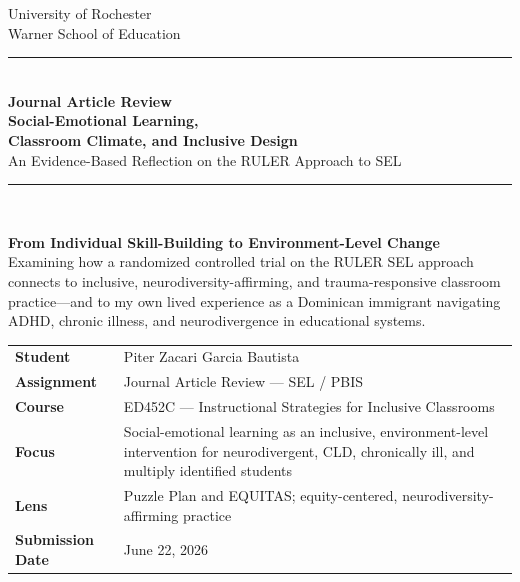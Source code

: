 \documentclass[11pt]{article}
\begin{document}
\begin{titlepage}
\thispagestyle{empty}

\begin{center}
{\large University of Rochester\\}
{\normalsize Warner School of Education\\[0.15in]}

{\color{PrimaryRed}\rule{\textwidth}{1.4pt}}\\[0.12in]
{\huge\bfseries Journal Article Review\\[0.08in]
\Huge Social-Emotional Learning,\\[0.08in]
Classroom Climate, and Inclusive Design}\\[0.18in]
{\Large An Evidence-Based Reflection on the RULER Approach to SEL}\\[0.12in]

\vfill

{\color{PrimaryRed}\rule{0.78\textwidth}{0.7pt}}\\[0.22in]

\colorbox{SoftBlue}{%
\parbox{0.88\textwidth}{%
\centering\small\vspace{0.02in}
\textbf{From Individual Skill-Building to Environment-Level Change}\\[0.05in]
Examining how a randomized controlled trial on the RULER SEL approach connects to inclusive, neurodiversity-affirming, and trauma-responsive classroom practice---and to my own lived experience as a Dominican immigrant navigating ADHD, chronic illness, and neurodivergence in educational systems.
}%
}
\end{center}

\vfill

\begin{center}
\renewcommand{\arraystretch}{1.18}
\setlength{\tabcolsep}{4pt}
\begin{tabular}{>{\bfseries\RaggedLeft}p{1.65in} p{4.9in}}
Student & Piter Zacari Garcia Bautista \\
Assignment & Journal Article Review --- SEL / PBIS \\
Course & ED452C --- Instructional Strategies for Inclusive Classrooms\\
Focus & Social-emotional learning as an inclusive, environment-level intervention for neurodivergent, CLD, chronically ill, and multiply identified students \\
Lens & Puzzle Plan and EQUITAS; equity-centered, neurodiversity-affirming practice \\
Submission Date & June 22, 2026 \\
\end{tabular}
\end{center}


\end{titlepage}
\end{document}
